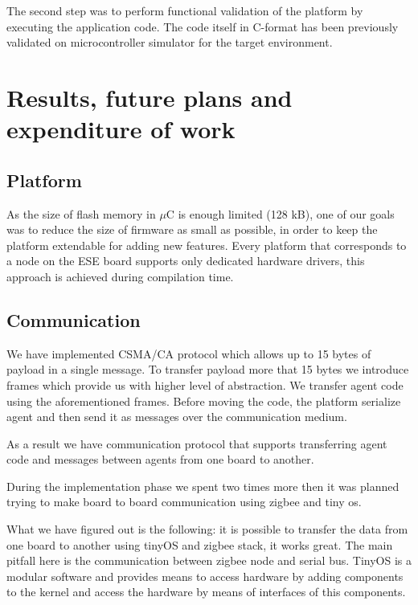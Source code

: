 \documentclass{scrreprt}
\begin{document}
The second step was to perform functional validation of the platform
by executing the application code. The code itself in C-format has been previously
validated on microcontroller simulator for the target environment.


\chapter{Results, future plans and expenditure of work}

\section{Platform}

As the size of flash memory in $\mu$C is enough limited (128 kB),
one of our goals was to reduce the size of firmware as small as possible,
in order to keep the platform extendable for adding new features.
Every platform that corresponds to a node on the ESE board supports only 
dedicated hardware drivers, this approach is achieved during compilation time.



\section{Communication}

We have implemented CSMA/CA protocol which allows up to 15 bytes of payload
in a single message.
To transfer payload more that 15 bytes we introduce frames which
provide us with higher level of abstraction.
We transfer agent code using the aforementioned frames.
Before moving the code, the platform serialize agent and then send it as
messages over the communication medium.

As a result we have communication protocol that supports transferring 
agent code and messages between agents from one board to another.

During the implementation phase we spent two times more then it was planned 
trying to make board to board communication using zigbee and tiny os.


What we have figured out is the following: it is possible to transfer the data
from one board to another using tinyOS and zigbee stack, it works great. 
The main pitfall here is the communication between zigbee node and serial bus.
TinyOS is a modular software and provides means to access hardware by adding 
components to the kernel and access the hardware by means of interfaces of this components.
\end{document}
